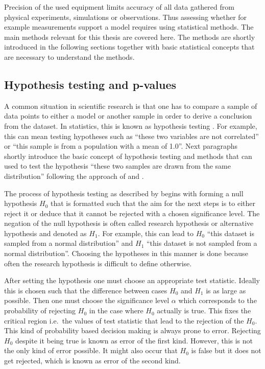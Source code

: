 \documentclass[english, oneside]{HYgradu}
\begin{document}
Precision of the used equipment limits accuracy of all data gathered from physical experiments, simulations or observations. Thus assessing whether for example measurements support a model requires using statistical methods. The main methods relevant for this thesis are covered here. The methods are shortly introduced in the following sections together with basic statistical concepts that are necessary to understand the methods. 



\subsection{Hypothesis testing and p-values}
A common situation in scientific research is that one has to compare a sample of data points to either a model or another sample in order to derive a conclusion from the dataset. In statistics, this is known as hypothesis testing \citep{wall2003practical}. For example, this can mean testing hypotheses such as ``these two variables are not correlated'' or ``this sample is from a population with a mean of 1.0''. Next paragraphs shortly introduce the basic concept of hypothesis testing and methods that can used to test the hypothesis ``these two samples are drawn from the same distribution'' following the approach of \citet{bohm2010introduction} and \citet{wall2003practical}.

The process of hypothesis testing as described by \citet{bohm2010introduction} begins with forming a null hypothesis $H_0$ that is formatted such that the aim for the next steps is to either reject it or deduce that it cannot be rejected with a chosen significance level. The negation of the null hypothesis is often called research hypothesis or alternative hypothesis and denoted as $H_1$. For example, this can lead to $H_0$ ``this dataset is sampled from a normal distribution'' and $H_1$ ``this dataset is not sampled from a normal distribution''. Choosing the hypotheses in this manner is done because often the research hypothesis is difficult to define otherwise.

After setting the hypothesis one must choose an appropriate test statistic. Ideally this is chosen such that the difference between cases $H_0$ and $H_1$ is as large as possible. Then one must choose 
the significance level $\alpha$ which corresponds to the probability of rejecting $H_0$ in the case where $H_0$ actually is true. This fixes the critical region i.e.\ the values of test statistic that lead to the rejection of the $H_0$. This kind of probability based decision making is always prone to error. Rejecting $H_0$ despite it being true is known as error of the first kind. However, this is not the only kind of error possible. It might also occur that $H_0$ is false but it does not get rejected, which is known as error of the second kind.
\end{document}
